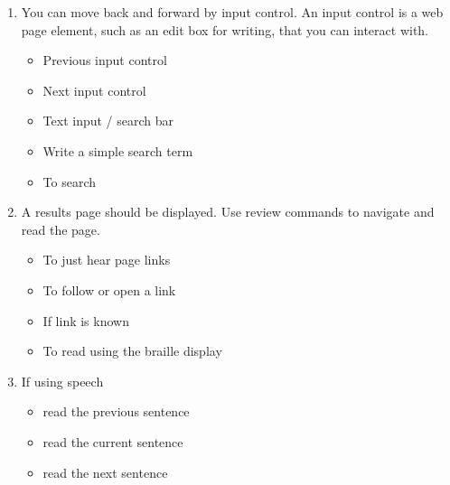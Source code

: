 \documentclass[10pt,letterpaper,twoside]{report}
\begin{document}
{\begin{enumerate}
\begin{enumerate}
\begin{itemize}
		            \end{itemize}
		      \item You can move back and forward by input control.  An input control is a web page element, such as an edit box for writing, that you can interact with.
		            \begin{itemize}
			            \item Previous input control 
			            \item Next input control 
			            \item Text input / search bar 
			            \item Write a simple search term
			            \item To search 
		            \end{itemize}
		      \item A results page should be displayed. Use review commands to navigate and read the page.
		            \begin{itemize}
			            \item To just hear page links 
			            \item To follow or open a link 
			            \item If link is known 
			            \item To read using the braille display 
		            \end{itemize}
		      \item If using speech
		            \begin{itemize}
			            \item read the previous sentence 
			            \item read the current sentence 
			            \item read the next sentence 

\end{itemize}
\end{enumerate}
\end{enumerate}}
\end{document}
